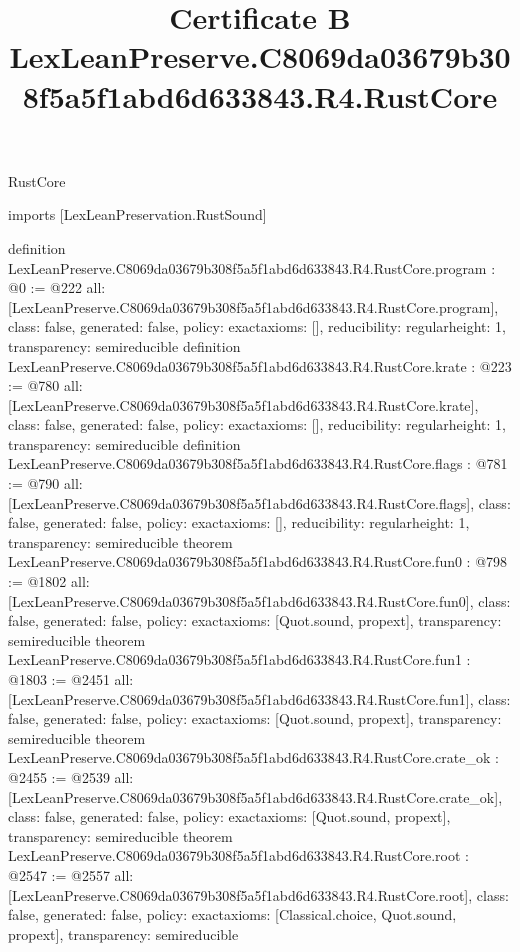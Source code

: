 \begin{lexlean}{RustCore}
\title{Certificate B LexLeanPreserve.C8069da03679b308f5a5f1abd6d633843.R4.RustCore}
\begin{coremodule}
imports [LexLeanPreservation.RustSound]

definition LexLeanPreserve.C8069da03679b308f5a5f1abd6d633843.R4.RustCore.program : @0 := @222 {
  all: [LexLeanPreserve.C8069da03679b308f5a5f1abd6d633843.R4.RustCore.program],
  class: false,
  generated: false,
  policy: exact{axioms: []},
  reducibility: regular{height: 1},
  transparency: semireducible
}
definition LexLeanPreserve.C8069da03679b308f5a5f1abd6d633843.R4.RustCore.krate : @223 := @780 {
  all: [LexLeanPreserve.C8069da03679b308f5a5f1abd6d633843.R4.RustCore.krate],
  class: false,
  generated: false,
  policy: exact{axioms: []},
  reducibility: regular{height: 1},
  transparency: semireducible
}
definition LexLeanPreserve.C8069da03679b308f5a5f1abd6d633843.R4.RustCore.flags : @781 := @790 {
  all: [LexLeanPreserve.C8069da03679b308f5a5f1abd6d633843.R4.RustCore.flags],
  class: false,
  generated: false,
  policy: exact{axioms: []},
  reducibility: regular{height: 1},
  transparency: semireducible
}
theorem LexLeanPreserve.C8069da03679b308f5a5f1abd6d633843.R4.RustCore.fun0 : @798 := @1802 {
  all: [LexLeanPreserve.C8069da03679b308f5a5f1abd6d633843.R4.RustCore.fun0],
  class: false,
  generated: false,
  policy: exact{axioms: [Quot.sound, propext]},
  transparency: semireducible
}
theorem LexLeanPreserve.C8069da03679b308f5a5f1abd6d633843.R4.RustCore.fun1 : @1803 := @2451 {
  all: [LexLeanPreserve.C8069da03679b308f5a5f1abd6d633843.R4.RustCore.fun1],
  class: false,
  generated: false,
  policy: exact{axioms: [Quot.sound, propext]},
  transparency: semireducible
}
theorem LexLeanPreserve.C8069da03679b308f5a5f1abd6d633843.R4.RustCore.crate_ok : @2455 := @2539 {
  all: [LexLeanPreserve.C8069da03679b308f5a5f1abd6d633843.R4.RustCore.crate_ok],
  class: false,
  generated: false,
  policy: exact{axioms: [Quot.sound, propext]},
  transparency: semireducible
}
theorem LexLeanPreserve.C8069da03679b308f5a5f1abd6d633843.R4.RustCore.root : @2547 := @2557 {
  all: [LexLeanPreserve.C8069da03679b308f5a5f1abd6d633843.R4.RustCore.root],
  class: false,
  generated: false,
  policy: exact{axioms: [Classical.choice, Quot.sound, propext]},
  transparency: semireducible
}


\end{coremodule}
\end{lexlean}
